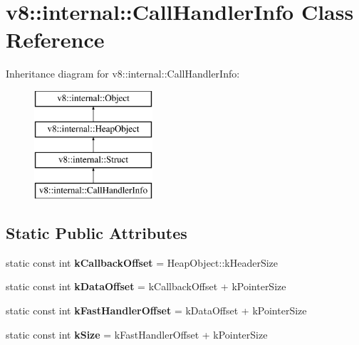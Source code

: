 \hypertarget{classv8_1_1internal_1_1_call_handler_info}{}\section{v8\+:\+:internal\+:\+:Call\+Handler\+Info Class Reference}
\label{classv8_1_1internal_1_1_call_handler_info}
Inheritance diagram for v8\+:\+:internal\+:\+:Call\+Handler\+Info\+:\begin{figure}[H]
\begin{center}
\leavevmode
\includegraphics[height=4.000000cm]{classv8_1_1internal_1_1_call_handler_info}
\end{center}
\end{figure}
\subsection*{Static Public Attributes}
\begin{DoxyCompactItemize}
\item 
static const int {\bfseries k\+Callback\+Offset} = Heap\+Object\+::k\+Header\+Size\hypertarget{classv8_1_1internal_1_1_call_handler_info_ad9aed9fb5614164f1b8d192b302790b5}{}\label{classv8_1_1internal_1_1_call_handler_info_ad9aed9fb5614164f1b8d192b302790b5}

\item 
static const int {\bfseries k\+Data\+Offset} = k\+Callback\+Offset + k\+Pointer\+Size\hypertarget{classv8_1_1internal_1_1_call_handler_info_aa561bcb66c855ae71541ccd05e8ba070}{}\label{classv8_1_1internal_1_1_call_handler_info_aa561bcb66c855ae71541ccd05e8ba070}

\item 
static const int {\bfseries k\+Fast\+Handler\+Offset} = k\+Data\+Offset + k\+Pointer\+Size\hypertarget{classv8_1_1internal_1_1_call_handler_info_a6219dc8218cb4c3ce76762339b409355}{}\label{classv8_1_1internal_1_1_call_handler_info_a6219dc8218cb4c3ce76762339b409355}

\item 
static const int {\bfseries k\+Size} = k\+Fast\+Handler\+Offset + k\+Pointer\+Size\hypertarget{classv8_1_1internal_1_1_call_handler_info_a0a3fbe1ab2ae6a37784983ece1b01d5d}{}\label{classv8_1_1internal_1_1_call_handler_info_a0a3fbe1ab2ae6a37784983ece1b01d5d}

\end{DoxyCompactItemize}
